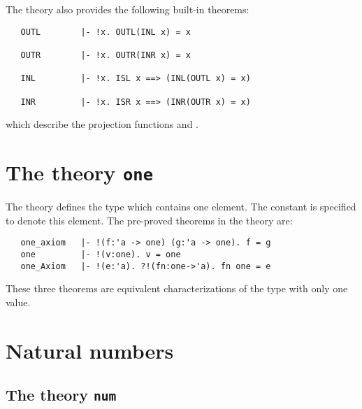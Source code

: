 \noindent The  theory also provides the following built-in theorems:

\begin{hol}
\begin{verbatim}
   OUTL        |- !x. OUTL(INL x) = x

   OUTR        |- !x. OUTR(INR x) = x

   INL         |- !x. ISL x ==> (INL(OUTL x) = x)

   INR         |- !x. ISR x ==> (INR(OUTR x) = x)
\end{verbatim}\end{hol}

\noindent which describe the projection functions  and .

\section{The theory {\tt one}}%
%
%

The theory  defines  the type   which  contains one element.
The constant    is specified  to denote  this element.   The pre-proved
theorems in the theory  are:

\begin{hol}
\begin{verbatim}
   one_axiom   |- !(f:'a -> one) (g:'a -> one). f = g
   one         |- !(v:one). v = one
   one_Axiom   |- !(e:'a). ?!(fn:one->'a). fn one = e
\end{verbatim}\end{hol}

\noindent These three theorems are equivalent characterizations of the type
with only one value.


\section{Natural numbers}

\subsection{The theory {\tt num}}

